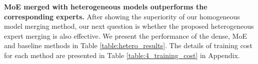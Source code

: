 \textbf{MoE merged with heterogeneous models outperforms the corresponding experts.} \quad
After showing the superiority of our homogeneous model merging method, our next question is whether the proposed heterogeneous expert merging is also effective.
We present the performance of the dense, MoE and baseline methods in Table \ref{table:hetero_results}. The details of training cost for each method are presented in Table \ref{table:4_training_cost} in Appendix.

\begin{table}[!htb]
\centering
{}
\end{table}
